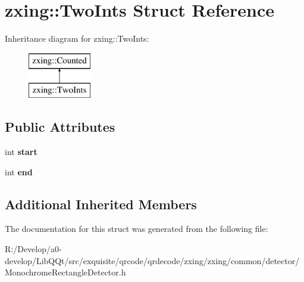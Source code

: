\hypertarget{structzxing_1_1_two_ints}{}\section{zxing\+:\+:Two\+Ints Struct Reference}
\label{structzxing_1_1_two_ints}
Inheritance diagram for zxing\+:\+:Two\+Ints\+:\begin{figure}[H]
\begin{center}
\leavevmode
\includegraphics[height=2.000000cm]{structzxing_1_1_two_ints}
\end{center}
\end{figure}
\subsection*{Public Attributes}
\begin{DoxyCompactItemize}
\item 
\mbox{\label{structzxing_1_1_two_ints_ac743154b6afbd8adf29445eb1a00d186}} 
int {\bfseries start}
\item 
\mbox{\label{structzxing_1_1_two_ints_a30975d826e5d0d64aa9e535a77b14afd}} 
int {\bfseries end}
\end{DoxyCompactItemize}
\subsection*{Additional Inherited Members}


The documentation for this struct was generated from the following file\+:\begin{DoxyCompactItemize}
\item 
R\+:/\+Develop/a0-\/develop/\+Lib\+Q\+Qt/src/exquisite/qrcode/qrdecode/zxing/zxing/common/detector/Monochrome\+Rectangle\+Detector.\+h\end{DoxyCompactItemize}
